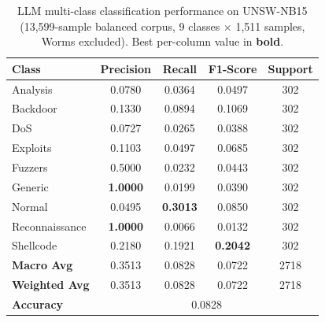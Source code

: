 \begin{table}[htbp]
\centering
\caption{LLM multi-class classification performance on UNSW-NB15
  (13{,}599-sample balanced corpus, 9 classes $\times$ 1{,}511 samples,
  Worms excluded). Best per-column value in \textbf{bold}.}
\label{tab:multiclass_llm_unsw}
\begin{tabular}{lcccc}
\toprule
\textbf{Class} & \textbf{Precision} & \textbf{Recall} & \textbf{F1-Score} & \textbf{Support} \\
\midrule
Analysis       & 0.0780 & 0.0364 & 0.0497 & 302 \\
Backdoor       & 0.1330 & 0.0894 & 0.1069 & 302 \\
DoS            & 0.0727 & 0.0265 & 0.0388 & 302 \\
Exploits       & 0.1103 & 0.0497 & 0.0685 & 302 \\
Fuzzers        & 0.5000 & 0.0232 & 0.0443 & 302 \\
Generic        & \textbf{1.0000} & 0.0199 & 0.0390 & 302 \\
Normal         & 0.0495 & \textbf{0.3013} & 0.0850 & 302 \\
Reconnaissance & \textbf{1.0000} & 0.0066 & 0.0132 & 302 \\
Shellcode      & 0.2180 & 0.1921 & \textbf{0.2042} & 302 \\
\midrule
\textbf{Macro Avg}    & 0.3513 & 0.0828 & 0.0722 & 2718 \\
\textbf{Weighted Avg} & 0.3513 & 0.0828 & 0.0722 & 2718 \\
\textbf{Accuracy}     & \multicolumn{4}{c}{0.0828} \\
\bottomrule
\end{tabular}
\end{table}


